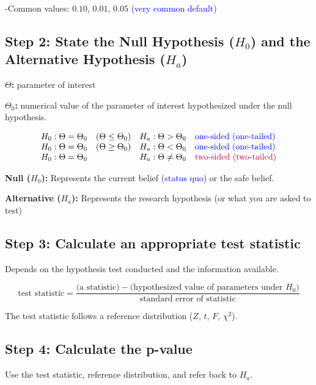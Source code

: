 -Common values: $0.10$, $0.01$, $0.05$ \textcolor{blue}{(very common default)}

\subsection*{Step 2: State the Null Hypothesis ($H_0$) and the Alternative Hypothesis ($H_a$)}

\textbf{$\Theta$:} parameter of interest

\textbf{$\Theta_0$:} numerical value of the parameter of interest hypothesized under the null hypothesis.

\[
\begin{array}{lll}
H_0: \Theta = \Theta_0 & (\Theta \leq \Theta_0) & H_a: \Theta > \Theta_0 \quad \textcolor{blue}{\text{one-sided (one-tailed)}} \\
H_0: \Theta = \Theta_0 & (\Theta \geq \Theta_0) & H_a: \Theta < \Theta_0 \quad \textcolor{blue}{\text{one-sided (one-tailed)}} \\
H_0: \Theta = \Theta_0 &                         & H_a: \Theta \neq \Theta_0 \quad \textcolor{purple}{\text{two-sided (two-tailed)}}
\end{array}
\]


\textbf{Null ($H_0$):} Represents the current belief (\textcolor{blue}{status quo}) or the safe belief.

\textbf{Alternative ($H_a$):} Represents the research hypothesis (or what you are asked to test)
\subsection*{Step 3: Calculate an appropriate test statistic}

Depends on the hypothesis test conducted and the information available.


\begin{definition}
\[
\text{test statistic} = \frac{\text{(a statistic)} - \text{(hypothesized value of parameters under } H_0 \text{)}}{\text{standard error of statistic}}
\]
\end{definition}

The test statistic follows a reference distribution ($Z$, $t$, $F$, $\chi^2$).
\subsection*{Step 4: Calculate the p-value}

\noindent
Use the test statistic, reference distribution, and refer back to $H_a$.

